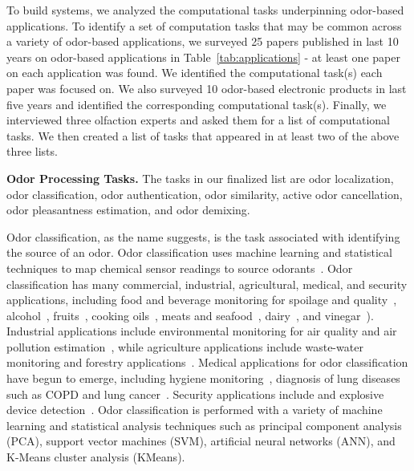 To build \olfc{} systems, we analyzed the computational tasks underpinning
odor-based applications. To identify a set of computation tasks that may be
common across a variety of odor-based applications, we surveyed 25 papers
published in last 10 years on odor-based applications in
Table~\ref{tab:applications} - at least one paper on each application was
found. We identified the computational task(s) each paper was focused on. We
also surveyed 10 odor-based electronic products in last five years and
identified the corresponding computational task(s). Finally, we interviewed
three olfaction experts and asked them for a list of computational tasks. We
then created a list of tasks that appeared in at least two of the above three
lists.

\textbf{Odor Processing Tasks.}
The tasks in our finalized list are odor localization, odor classification,
odor authentication, odor similarity, active odor cancellation, odor
pleasantness estimation, and odor demixing.

Odor classification, as the name suggests, is the task associated with
identifying the source of an odor.  Odor classification uses machine learning
and statistical techniques to map chemical sensor readings to source
odorants~\cite{kaeppler2013odor, husni2017odor}. Odor classification has many
commercial, industrial, agricultural, medical, and security applications,
including food and beverage monitoring for spoilage and
quality~\cite{yu2008quality, pan2014early, chen2013classification,
yu2008identification, yu2009identification}, alcohol~\cite{
    zhang2021channel,buratti2004characterization,shi2019deep},
    fruits~\cite{pan2014early, chen2018characterization, chen2018development,
    du2019ripeness, rasekh2021nose, wu2017sensor}, cooking
    oils~\cite{karami2020application, teixeira2021application,
    rasekh2021classification}, meats and seafood~\cite{panigrahi2006design,
    wijaya2019noise, wijaya2021dwtlstm, aunsa2021electronic,
    grassi2022seafood}, dairy~\cite{yang2021application, labreche2005shelf},
    and vinegar~\cite{li2022physicochemical, anklam1998characterisation}).
    Industrial applications include environmental monitoring for air quality
    and air pollution estimation~\cite{caron2019identification,
    szulczynski2017different, tacstan2019real, de2008tinynose}, while
    agriculture applications include waste-water monitoring and forestry
    applications~\cite{wilson2013diverse, blanco2018development,
    lagod2019application, dewettinck2001electronic}. Medical applications for
    odor classification have begun to emerge, including hygiene
    monitoring~\cite{lorwongtragool2014novel}, diagnosis of lung diseases such
    as COPD and lung cancer~\cite{gardner2000electronic, va2021noninvasive,
    binson2021discrimination, d2010investigation}. Security applications
    include and explosive device detection~\cite{brudzewski2012metal,
    lopez2017electronic, sun2013liquid}. Odor classification is performed with
    a variety of machine learning and statistical analysis techniques such as
    principal component analysis (PCA), support vector machines (SVM),
    artificial neural networks (ANN), and K-Means cluster analysis (KMeans).

